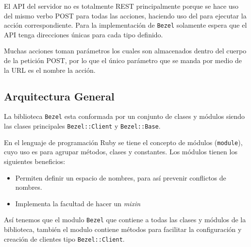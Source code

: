 El API del servidor no es totalmente REST principalmente porque se hace
uso del mismo verbo POST para todas las acciones, haciendo uso del
 para ejecutar la acción correspondiente. Para
la implementación de \texttt{Bezel} solamente espera que el API tenga
direcciones únicas para cada tipo definido.

Muchas acciones toman parámetros los cuales son almacenados dentro del cuerpo
de la petición POST, por lo que el único parámetro que se manda por medio
de la URL es el nombre la acción.

\subsection{Arquitectura General}

La biblioteca \texttt{Bezel} esta conformada por un conjunto de clases y
módulos siendo las clases principales \texttt{Bezel::Client} y \texttt{Bezel::Base}.

En el lenguaje de programación Ruby se tiene el concepto de módulos (\texttt{module}), cuyo uso es para agrupar métodos, clases y constantes. Los módulos tienen los
siguientes beneficios:

\begin{itemize}
\item Permiten definir un espacio de nombres, para así prevenir conflictos de nombres.
\item Implementa la facultad de hacer un \textit{mixin}
\end{itemize}


Así tenemos que el modulo \texttt{Bezel} que contiene a todas las clases y módulos
de la biblioteca, también el modulo contiene métodos para facilitar la configuración
y creación de clientes tipo \texttt{Bezel::Client}.

